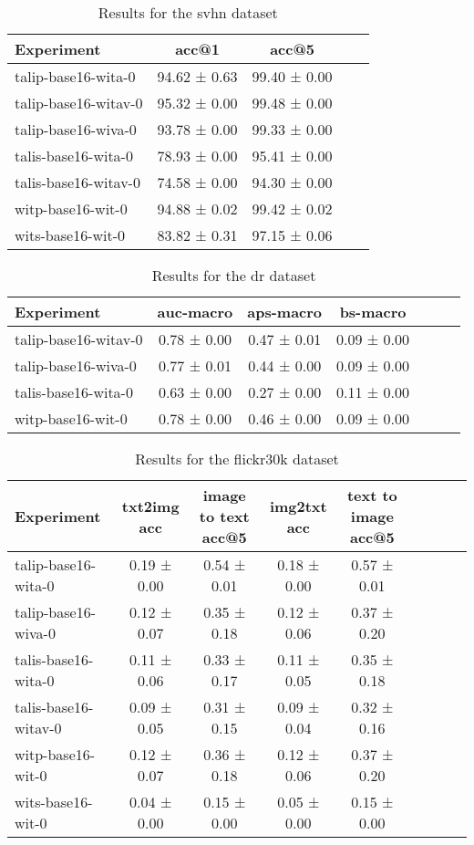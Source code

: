 \begin{table}[htbp]
\caption{Results for the svhn dataset}
\begin{tabular}{|l|c|c|c|c|}\hline
Experiment & acc@1 & acc@5\\
\hline
talip-base16-wita-0 & 94.62 ± 0.63 & 99.40 ± 0.00\\
\hline
talip-base16-witav-0 & 95.32 ± 0.00 & 99.48 ± 0.00\\
\hline
talip-base16-wiva-0 & 93.78 ± 0.00 & 99.33 ± 0.00\\
\hline
talis-base16-wita-0 & 78.93 ± 0.00 & 95.41 ± 0.00\\
\hline
talis-base16-witav-0 & 74.58 ± 0.00 & 94.30 ± 0.00\\
\hline
witp-base16-wit-0 & 94.88 ± 0.02 & 99.42 ± 0.02\\
\hline
wits-base16-wit-0 & 83.82 ± 0.31 & 97.15 ± 0.06\\
\hline
\end{tabular}
\end{table}

\begin{table}[htbp]
\caption{Results for the dr dataset}
\begin{tabular}{|l|c|c|c|c|c|c|}\hline
Experiment & auc-macro & aps-macro & bs-macro\\
\hline
talip-base16-witav-0 & 0.78 ± 0.00 & 0.47 ± 0.01 & 0.09 ± 0.00\\
\hline
talip-base16-wiva-0 & 0.77 ± 0.01 & 0.44 ± 0.00 & 0.09 ± 0.00\\
\hline
talis-base16-wita-0 & 0.63 ± 0.00 & 0.27 ± 0.00 & 0.11 ± 0.00\\
\hline
witp-base16-wit-0 & 0.78 ± 0.00 & 0.46 ± 0.00 & 0.09 ± 0.00\\
\hline
\end{tabular}
\end{table}

\begin{table}[htbp]
\caption{Results for the flickr30k dataset}
\begin{tabular}{|l|c|c|c|c|c|c|c|c|}\hline
Experiment & txt2img acc & image to text acc@5 & img2txt acc & text to image acc@5\\
\hline
talip-base16-wita-0 & 0.19 ± 0.00 & 0.54 ± 0.01 & 0.18 ± 0.00 & 0.57 ± 0.01\\
\hline
talip-base16-wiva-0 & 0.12 ± 0.07 & 0.35 ± 0.18 & 0.12 ± 0.06 & 0.37 ± 0.20\\
\hline
talis-base16-wita-0 & 0.11 ± 0.06 & 0.33 ± 0.17 & 0.11 ± 0.05 & 0.35 ± 0.18\\
\hline
talis-base16-witav-0 & 0.09 ± 0.05 & 0.31 ± 0.15 & 0.09 ± 0.04 & 0.32 ± 0.16\\
\hline
witp-base16-wit-0 & 0.12 ± 0.07 & 0.36 ± 0.18 & 0.12 ± 0.06 & 0.37 ± 0.20\\
\hline
wits-base16-wit-0 & 0.04 ± 0.00 & 0.15 ± 0.00 & 0.05 ± 0.00 & 0.15 ± 0.00\\
\hline
\end{tabular}
\end{table}

